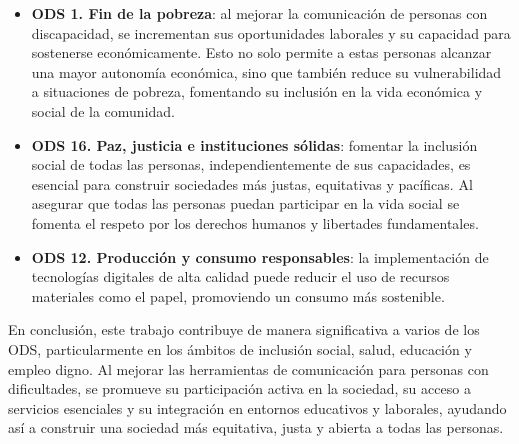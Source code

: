 \documentclass[11pt]{article}
\begin{document}
\begin{itemize}
	\item \textbf{ODS 1. Fin de la pobreza}: al mejorar la comunicación de personas con discapacidad, se incrementan sus oportunidades laborales y su capacidad para sostenerse económicamente. Esto no solo permite a estas personas alcanzar una mayor autonomía económica, sino que también reduce su vulnerabilidad a situaciones de pobreza, fomentando su inclusión en la vida económica y social de la comunidad.
	\item \textbf{ODS 16. Paz, justicia e instituciones sólidas}: fomentar la inclusión social de todas las personas, independientemente de sus capacidades, es esencial para construir sociedades más justas, equitativas y pacíficas. Al asegurar que todas las personas puedan participar en la vida social se fomenta el respeto por los derechos humanos y libertades fundamentales.
	\item \textbf{ODS 12. Producción y consumo responsables}: la implementación de tecnologías digitales de alta calidad puede reducir el uso de recursos materiales como el papel, promoviendo un consumo más sostenible.
\end{itemize}

En conclusión, este trabajo contribuye de manera significativa a varios de los ODS, particularmente en los ámbitos de inclusión social, salud, educación y empleo digno. Al mejorar las herramientas de comunicación para personas con dificultades, se promueve su participación activa en la sociedad, su acceso a servicios esenciales y su integración en entornos educativos y laborales, ayudando así a construir una sociedad más equitativa, justa y abierta a todas las personas.
\end{document}
